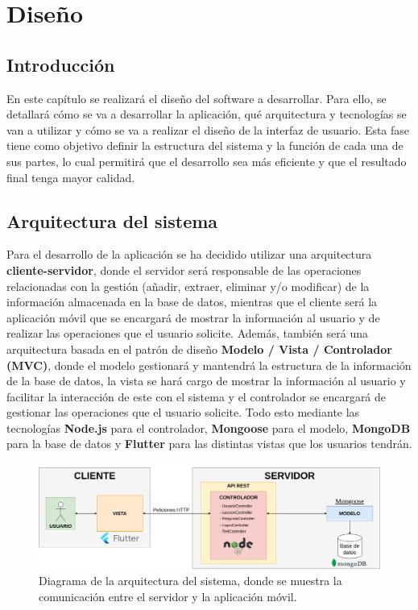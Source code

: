 \chapter{Diseño}

\section{Introducción}
En este capítulo se realizará el diseño del software a desarrollar. Para ello, se detallará cómo se va a desarrollar la aplicación, qué arquitectura y tecnologías se van a utilizar y cómo se va a realizar el diseño de la interfaz de usuario. 
Esta fase tiene como objetivo definir la estructura del sistema y la función de cada una de sus partes, lo cual permitirá que el desarrollo sea más eficiente y que el resultado final tenga mayor calidad.

\section{Arquitectura del sistema}
Para el desarrollo de la aplicación se ha decidido utilizar una arquitectura \textbf{cliente-servidor}, donde el servidor será responsable de las operaciones relacionadas con la gestión (añadir, extraer, eliminar y/o modificar) de la información almacenada en la base de datos, mientras que el cliente será 
la aplicación móvil que se encargará de mostrar la información al usuario y de realizar las operaciones que el usuario solicite. Además, también será una arquitectura basada en el patrón de diseño \textbf{Modelo / Vista / Controlador (MVC)}, donde el modelo gestionará y mantendrá la estructura de la información
de la base de datos, la vista se hará cargo de mostrar la información al usuario y facilitar la interacción de este con el sistema y el controlador se encargará de gestionar las operaciones que el usuario solicite. Todo esto mediante las tecnologías \textbf{Node.js} para el controlador, \textbf{Mongoose} para
el modelo, \textbf{MongoDB} para la base de datos y \textbf{Flutter} para las distintas vistas que los usuarios tendrán. 

\begin{figure}[H]
    \centering
    \centerline{\includegraphics[width=1.1\textwidth]{imagenes/c6/arch.png}}
    \caption{Diagrama de la arquitectura del sistema, donde se muestra la comunicación entre el servidor y la aplicación móvil.}
    \label{fig:diagramadearquitectura}    
\end{figure}

